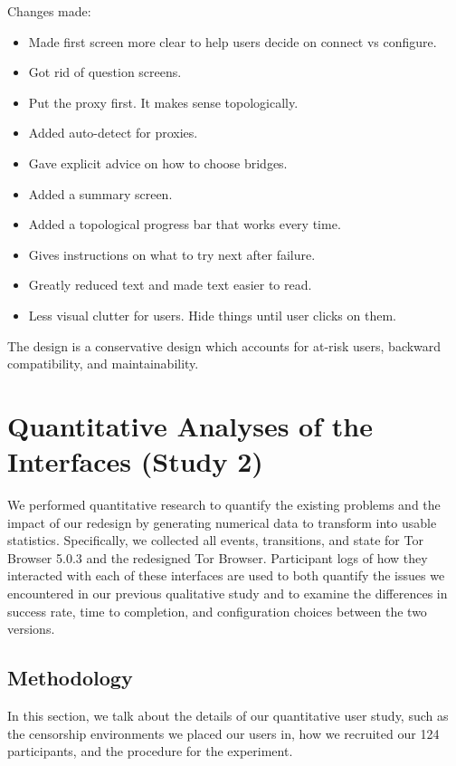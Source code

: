 \documentclass{template}
\begin{document}
{\color {red} 

Changes made: 

\begin{itemize} \itemsep1pt \parskip0pt  
\item Made first screen more clear to help users decide on connect vs configure. 
\item Got rid of question screens. 
\item Put the proxy first. It makes sense topologically. 
\item Added auto-detect for proxies. 
\item Gave explicit advice on how to choose bridges. 
\item Added a summary screen. 
\item Added a topological progress bar that works every time. 
\item Gives instructions on what to try next after failure. 
\item Greatly reduced text and made text easier to read. 
\item Less visual clutter for users. Hide things until user clicks on them. 
\end{itemize} 

The design is a conservative design which accounts for at-risk users, backward compatibility, and maintainability. 
}

\section{Quantitative Analyses of the Interfaces (Study 2)}
\label{sec:quantitative}
We performed quantitative research to quantify the existing problems
and the impact of our redesign by generating numerical data to transform
into usable statistics. Specifically, we collected all events, transitions, 
and state for Tor Browser 5.0.3 and the redesigned Tor Browser. Participant
logs of how they interacted with each of these interfaces are used to both
quantify the issues we encountered in our previous qualitative 
study and to examine the differences in success rate, time to completion,
and configuration choices between the two versions. 

\subsection{Methodology} 
In this section, we talk about the details of our quantitative user study, such as the censorship environments we placed our users in, how we recruited our 124 participants, and the procedure for the experiment. 
\end{document}
